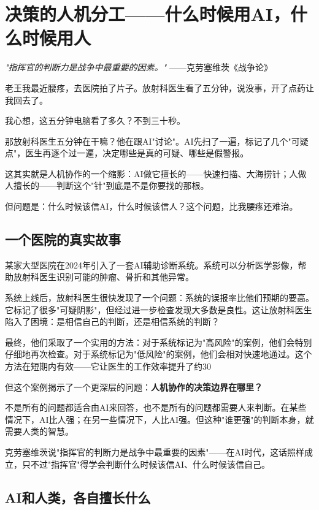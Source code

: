 \chapter{决策的人机分工——什么时候用AI，什么时候用人}


\textit{"指挥官的判断力是战争中最重要的因素。"}
——克劳塞维茨《战争论》


老王我最近腰疼，去医院拍了片子。放射科医生看了五分钟，说没事，开了点药让我回去了。

我心想，这五分钟电脑看了多久？不到三十秒。

那放射科医生五分钟在干嘛？他在跟AI"讨论"。AI先扫了一遍，标记了几个"可疑点"，医生再逐个过一遍，决定哪些是真的可疑、哪些是假警报。

这其实就是人机协作的一个缩影：AI做它擅长的——快速扫描、大海捞针；人做人擅长的——判断这个"针"到底是不是你要找的那根。

但问题是：什么时候该信AI，什么时候该信人？这个问题，比我腰疼还难治。

\section{一个医院的真实故事}


某家大型医院在2024年引入了一套AI辅助诊断系统。系统可以分析医学影像，帮助放射科医生识别可能的肿瘤、骨折和其他异常。

系统上线后，放射科医生很快发现了一个问题：系统的误报率比他们预期的要高。它标记了很多"可疑阴影"，但经过进一步检查发现大多数是良性。这让放射科医生陷入了困境：是相信自己的判断，还是相信系统的判断？

最终，他们采取了一个实用的方法：对于系统标记为"高风险"的案例，他们会特别仔细地再次检查。对于系统标记为"低风险"的案例，他们会相对快速地通过。这个方法在短期内有效——它让医生的工作效率提升了约30%

但这个案例揭示了一个更深层的问题：\textbf{人机协作的决策边界在哪里？}

不是所有的问题都适合由AI来回答，也不是所有的问题都需要人来判断。在某些情况下，AI比人强；在另一些情况下，人比AI强。但这种"谁更强"的判断本身，就需要人类的智慧。

克劳塞维茨说"指挥官的判断力是战争中最重要的因素"——在AI时代，这话照样成立，只不过"指挥官"得学会判断什么时候该信AI、什么时候该信自己。

\section{AI和人类，各自擅长什么}


